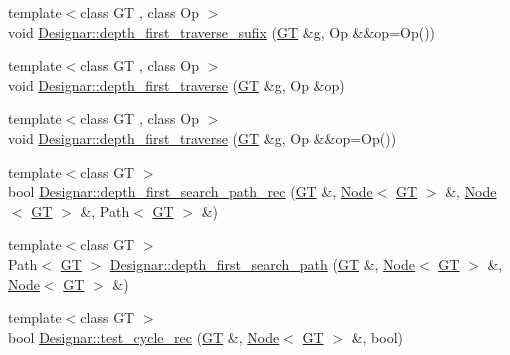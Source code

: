 \begin{DoxyCompactItemize}
\item 
{\footnotesize template$<$class GT , class Op $>$ }\\void \hyperlink{namespace_designar_ae742525c8bae623299150bcbcc317d6c}{Designar\+::depth\+\_\+first\+\_\+traverse\+\_\+sufix} (\hyperlink{demo-buildgraph_8_c_a3001c40d2c31ca87ed96cd7d1334a55e}{GT} \&g, Op \&\&op=Op())
\item 
{\footnotesize template$<$class GT , class Op $>$ }\\void \hyperlink{namespace_designar_a259944a482130c7a304058ed801872a9}{Designar\+::depth\+\_\+first\+\_\+traverse} (\hyperlink{demo-buildgraph_8_c_a3001c40d2c31ca87ed96cd7d1334a55e}{GT} \&g, Op \&op)
\item 
{\footnotesize template$<$class GT , class Op $>$ }\\void \hyperlink{namespace_designar_a40329a328d24d8ac25f540902fb69159}{Designar\+::depth\+\_\+first\+\_\+traverse} (\hyperlink{demo-buildgraph_8_c_a3001c40d2c31ca87ed96cd7d1334a55e}{GT} \&g, Op \&\&op=Op())
\item 
{\footnotesize template$<$class GT $>$ }\\bool \hyperlink{namespace_designar_a0a2a9a44cfea24efc22cab8b8a9d2acd}{Designar\+::depth\+\_\+first\+\_\+search\+\_\+path\+\_\+rec} (\hyperlink{demo-buildgraph_8_c_a3001c40d2c31ca87ed96cd7d1334a55e}{GT} \&, \hyperlink{test-mtreenode_8_c_a17a24b0725f59987143c5faf63c4dc6f}{Node}$<$ \hyperlink{demo-buildgraph_8_c_a3001c40d2c31ca87ed96cd7d1334a55e}{GT} $>$ \&, \hyperlink{test-mtreenode_8_c_a17a24b0725f59987143c5faf63c4dc6f}{Node}$<$ \hyperlink{demo-buildgraph_8_c_a3001c40d2c31ca87ed96cd7d1334a55e}{GT} $>$ \&, Path$<$ \hyperlink{demo-buildgraph_8_c_a3001c40d2c31ca87ed96cd7d1334a55e}{GT} $>$ \&)
\item 
{\footnotesize template$<$class GT $>$ }\\Path$<$ \hyperlink{demo-buildgraph_8_c_a3001c40d2c31ca87ed96cd7d1334a55e}{GT} $>$ \hyperlink{namespace_designar_ab5b060dde0b717e9818c796da60b39b1}{Designar\+::depth\+\_\+first\+\_\+search\+\_\+path} (\hyperlink{demo-buildgraph_8_c_a3001c40d2c31ca87ed96cd7d1334a55e}{GT} \&, \hyperlink{test-mtreenode_8_c_a17a24b0725f59987143c5faf63c4dc6f}{Node}$<$ \hyperlink{demo-buildgraph_8_c_a3001c40d2c31ca87ed96cd7d1334a55e}{GT} $>$ \&, \hyperlink{test-mtreenode_8_c_a17a24b0725f59987143c5faf63c4dc6f}{Node}$<$ \hyperlink{demo-buildgraph_8_c_a3001c40d2c31ca87ed96cd7d1334a55e}{GT} $>$ \&)
\item 
{\footnotesize template$<$class GT $>$ }\\bool \hyperlink{namespace_designar_a1d3028c78c40ec397096fb112f34eb78}{Designar\+::test\+\_\+cycle\+\_\+rec} (\hyperlink{demo-buildgraph_8_c_a3001c40d2c31ca87ed96cd7d1334a55e}{GT} \&, \hyperlink{test-mtreenode_8_c_a17a24b0725f59987143c5faf63c4dc6f}{Node}$<$ \hyperlink{demo-buildgraph_8_c_a3001c40d2c31ca87ed96cd7d1334a55e}{GT} $>$ \&, bool)

\end{DoxyCompactItemize}
